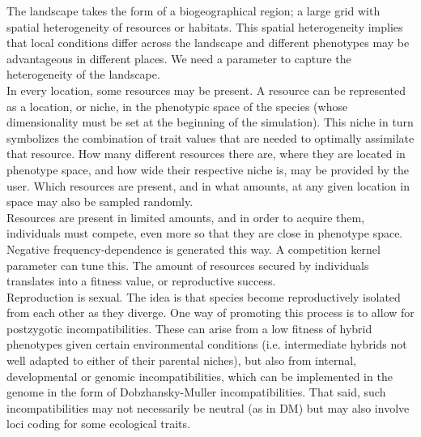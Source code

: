 \documentclass[]{article}
\begin{document}
The landscape takes the form of a biogeographical region; a large grid with spatial heterogeneity of resources or habitats. This spatial heterogeneity implies that local conditions differ across the landscape and different phenotypes may be advantageous in different places. We need a parameter to capture the heterogeneity of the landscape.\\

In every location, some resources may be present. A resource can be represented as a location, or niche, in the phenotypic space of the species (whose dimensionality must be set at the beginning of the simulation). This niche in turn symbolizes the combination of trait values that are needed to optimally assimilate that resource. How many different resources there are, where they are located in phenotype space, and how wide their respective niche is, may be provided by the user. Which resources are present, and in what amounts, at any given location in space may also be sampled randomly.\\

Resources are present in limited amounts, and in order to acquire them, individuals must compete, even more so that they are close in phenotype space. Negative frequency-dependence is generated this way. A competition kernel parameter can tune this. The amount of resources secured by individuals translates into a fitness value, or reproductive success.\\

Reproduction is sexual. The idea is that species become reproductively isolated from each other as they diverge. One way of promoting this process is to allow for postzygotic incompatibilities. These can arise from a low fitness of hybrid phenotypes given certain environmental conditions (i.e. intermediate hybrids not well adapted to either of their parental niches), but also from internal, developmental or genomic incompatibilities, which can be implemented in the genome in the form of Dobzhansky-Muller incompatibilities. That said, such incompatibilities may not necessarily be neutral (as in DM) but may also involve loci coding for some ecological traits.\\
\end{document}
